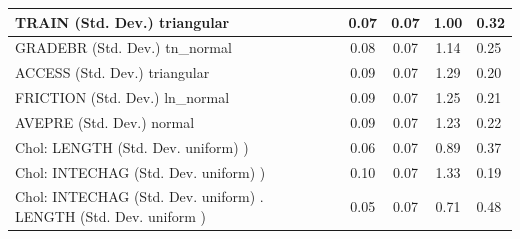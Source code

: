 \begin{table}
\begin{center}
\begin{tabular}{|l|l|c|c|c|l|}
			\hline
			TRAIN (Std. Dev.) triangular &  & 0.07 & 0.07 & 1.00 & 0.32 \\
			\hline
			GRADEBR (Std. Dev.) tn_normal &  & 0.08 & 0.07 & 1.14 & 0.25 \\
			\hline
			ACCESS (Std. Dev.) triangular &  & 0.09 & 0.07 & 1.29 & 0.20 \\
			\hline
			FRICTION (Std. Dev.) ln_normal &  & 0.09 & 0.07 & 1.25 & 0.21 \\
			\hline
			AVEPRE (Std. Dev.) normal &  & 0.09 & 0.07 & 1.23 & 0.22 \\
			\hline
			 Chol: LENGTH (Std. Dev. uniform) ) &  & 0.06 & 0.07 & 0.89 & 0.37 \\
			\hline
			 Chol: INTECHAG (Std. Dev. uniform) ) &  & 0.10 & 0.07 & 1.33 & 0.19 \\
			\hline
			 Chol: INTECHAG (Std. Dev. uniform) . LENGTH (Std. Dev.   uniform ) &  & 0.05 & 0.07 & 0.71 & 0.48 \\
			\hline
		\end{tabular}
	\end{center}
\end{table}